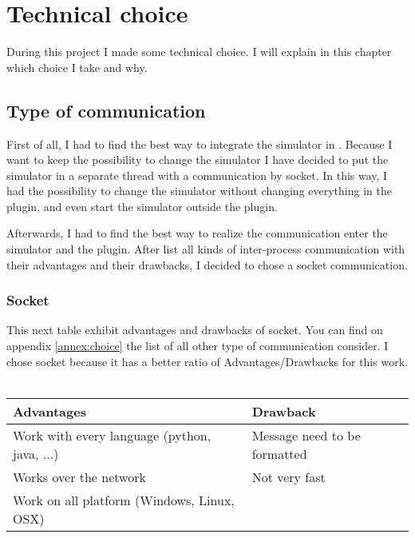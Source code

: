 
\chapter{Technical choice }
\label{chap:choice}
During this project I made some technical choice. I will explain in this chapter which choice I take and why.

\section{Type of communication}

First of all, I had to find the best way to integrate the simulator in \umld. Because I want to keep the possibility to change the simulator I have decided to put the simulator in a separate thread with a communication by socket. In this way, I had the possibility to change the simulator without changing everything in the plugin, and even start the simulator outside the plugin.

Afterwards, I had to find the best way to realize the communication enter the simulator and the plugin. After list all kinds of inter-process communication with their advantages and their drawbacks, I decided to chose a socket communication.%




\subsection{Socket}

This next table exhibit advantages and drawbacks of socket. You can find on appendix \ref{annex:choice} the list of all other type of communication consider. I chose socket  because it has a better ratio of Advantages/Drawbacks for this work.
~\\

\begin{tabular}{|p{}||p{}|}
  \hline
  \textbf{Advantages}&\textbf{Drawback}\\
  \hline
  Work with every language (python, java, ...) & Message need to be formatted\\
  \hline
  Works over the network& Not very fast\\
  \hline
  Work on all platform (Windows, Linux, OSX)&\\
  \hline
\end{tabular}



